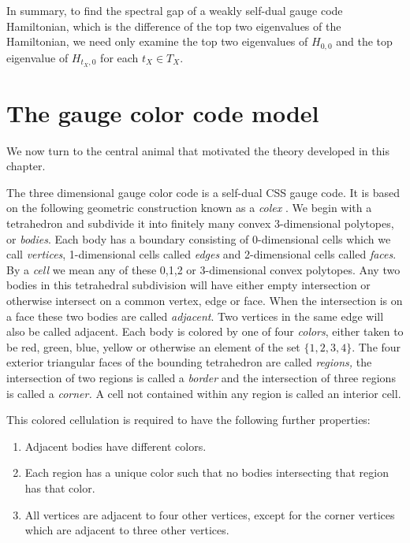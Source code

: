 In summary, 
to find the spectral gap of a weakly self-dual gauge code Hamiltonian,
which is the difference of the top two eigenvalues of the Hamiltonian,
we need only examine the top two eigenvalues of $H_{0,0}$ and 
the top eigenvalue of $H_{t_X,0}$ for each $t_X\in T_X.$ 

\section{The gauge color code model}

%

We now turn to the central animal that motivated
the theory developed in this chapter.

The three dimensional gauge color code \cite{Bombin2015,Bombin2015single,Kubica2015}
is a self-dual CSS gauge code. 
It is based on the following geometric construction known
as a \emph{colex} \cite{Bombin2007exact}.
We begin with a tetrahedron and subdivide it into finitely many
convex 3-dimensional polytopes, or \emph{bodies}.
Each body has a boundary consisting of 0-dimensional cells
which we call \emph{vertices}, 1-dimensional cells called \emph{edges}
and 2-dimensional cells called \emph{faces}.
By a \emph{cell} we mean any of these 0,1,2 or 3-dimensional convex polytopes.
Any two bodies in this tetrahedral subdivision will
have either empty intersection or otherwise intersect
on a common vertex, edge or face.
When the intersection is on a face these two bodies
are called \emph{adjacent}.
Two vertices in the same edge will also be called adjacent.
Each body is colored by one of four \emph{colors},
either taken to be red, green, blue, yellow or 
otherwise an element of the set $\{1, 2, 3, 4\}.$
The four exterior triangular faces of the bounding tetrahedron are
called \emph{regions,} the intersection of two regions is called
a \emph{border} and the intersection of three regions is called
a \emph{corner.}
A cell not contained within any region is called an interior cell.

This colored cellulation is required to have the following further properties:
\begin{enumerate}
\item Adjacent bodies have different colors.
\item Each region has a unique color 
such that no bodies intersecting that region has that color.
\item All vertices are adjacent to four other vertices,
except for the corner vertices which are adjacent to three other vertices.
\end{enumerate}


